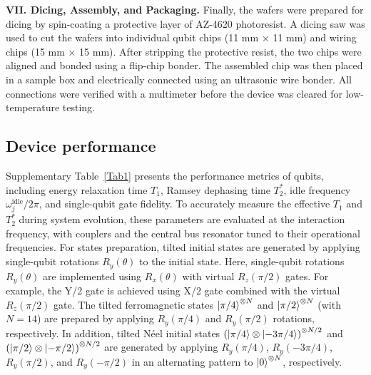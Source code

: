 \documentclass[reprint,superscriptaddress,preprintnumbers,longbibliography,
amsmath,amssymb,aps,floatfix,pra,twocolumn, tightenlines %
]{revtex4-2}
\begin{document}
    \textbf{VII. Dicing, Assembly, and Packaging.}
    Finally, the wafers were prepared for dicing by spin-coating a protective layer of AZ-4620 photoresist. A dicing saw was used to cut the wafers into individual qubit chips (11 mm × 11 mm) and wiring chips (15 mm × 15 mm). After stripping the protective resist, the two chips were aligned and bonded using a flip-chip bonder. The assembled chip was then placed in a sample box and electrically connected using an ultrasonic wire bonder. All connections were verified with a multimeter before the device was cleared for low-temperature testing.
	
	\subsection{Device performance}
    Supplementary Table~\ref{Tab1} presents the performance metrics of qubits, including energy relaxation time \( T_1 \), Ramsey dephasing time \( T_2^* \), idle frequency $\omega^{\mathrm{idle}}_{j}/2\pi$, and single-qubit gate fidelity. To accurately measure the effective \( T_1 \) and \( T_2^* \) during system evolution, these parameters are evaluated at the interaction frequency, with couplers and the central bus resonator tuned to their operational frequencies. For states preparation, tilted initial states are generated by applying single-qubit rotations \( R_y(\theta) \) to the initial state. Here, single-qubit rotations \( R_y(\theta) \) are implemented using \( R_x(\theta) \) with virtual \( R_z(\pi/2) \) gates. For example, the  Y/2 gate is achieved using X/2 gate combined with the virtual \( R_z(\pi/2) \) gate. The tilted ferromagnetic states \(\ket{\pi/4}^{\otimes N}\) and \(\ket{\pi/2}^{\otimes N}\) (with $N=14$) are prepared by applying \( R_y(\pi/4) \) and \( R_y(\pi/2) \) rotations, respectively. In addition, tilted Néel initial states \(\left( \ket{\pi/4} \otimes \ket{-3\pi/4} \right)^{\otimes N/2}\) and \(\left( \ket{\pi/2} \otimes \ket{-\pi/2} \right)^{\otimes N/2}\) are generated by applying \( R_y(\pi/4) \), \( R_y(-3\pi/4) \), \( R_y(\pi/2) \), and \( R_y(-\pi/2) \) in an alternating pattern to \(\ket{0}^{\otimes N}\), respectively.
\end{document}
